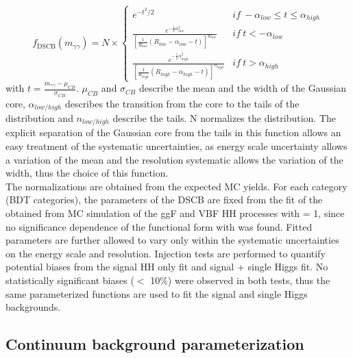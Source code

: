 \begin{equation}
    f_{\mathrm{DSCB}}\left(m_{\gamma \gamma}\right)=N \times\left\{\begin{array}{ll}
e^{-t^{2} / 2} &  if \ -\alpha_{low } \leq t \leq \alpha_{high } \\

\frac{e^{-\frac{1}{2} \alpha_{low }^{2}}} {  \left[  \frac{1}{ R_{low} } \left(R_{low }-\alpha_{low }-t\right) \right]^{n_{low }}} & if \ t<-\alpha_{low } \\

\frac{e^{-\frac{1}{2} \alpha_{high }^{2}}} {  \left[  \frac{1}{ R_{high} } \left(R_{high }-\alpha_{high }-t\right) \right]^{n_{high }}} &  if \ t>\alpha_{high }
\end{array}\right.
\end{equation}
with $t = \frac{m_{\gamma\gamma} - \mu_{CB}}{\sigma_{CB}}$. $\mu_{CB}$ and $\sigma_{CB}$ describe the mean and the width of the Gaussian core, $\alpha_{low/high}$ describes the transition from the core to the tails of the distribution and $n_{low/high}$ describe the tails. N normalizes the distribution. The explicit separation of the Gaussian core from the tails in this function allows an easy treatment of the systematic uncertainties, as energy scale uncertainty allows a variation of the mean and the resolution systematic allows the variation of the width, thus the choice of this function.\\
The normalizations are obtained from the expected MC yields. For each category (BDT categories), the parameters of the DSCB are fixed from the fit of the \myy obtained from MC simulation of the ggF and VBF HH processes with \kl = 1, since no significance dependence of the functional form with \kl was found. Fitted parameters are further allowed to vary only within the systematic uncertainties on the energy scale and resolution. Injection tests are performed to quantify potential biases from the signal HH only fit and signal + single Higgs fit. No statistically significant biases ($<$ 10\%) were observed in both tests, thus the same parameterized functions are used to fit the signal and single Higgs backgrounds.    

\subsection{Continuum background parameterization}
\label{HHyybb:Modelling:Bkg}


